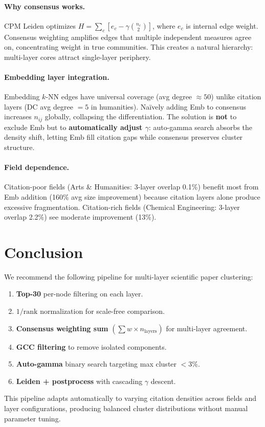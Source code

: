 \documentclass[11pt,a4paper]{article}
\begin{document}
\paragraph{Why consensus works.} CPM Leiden optimizes $H = \sum_c \left[e_c - \gamma \binom{n_c}{2}\right]$, where $e_c$ is internal edge weight. Consensus weighting amplifies edges that multiple independent measures agree on, concentrating weight in true communities. This creates a natural hierarchy: multi-layer cores attract single-layer periphery.

\paragraph{Embedding layer integration.} Embedding $k$-NN edges have universal coverage (avg degree $\approx 50$) unlike citation layers (DC avg degree $= 5$ in humanities). Na\"ively adding Emb to consensus increases $n_{ij}$ globally, collapsing the differentiation. The solution is \textbf{not} to exclude Emb but to \textbf{automatically adjust $\gamma$}: auto-gamma search absorbs the density shift, letting Emb fill citation gaps while consensus preserves cluster structure.

\paragraph{Field dependence.} Citation-poor fields (Arts \& Humanities: 3-layer overlap 0.1\%) benefit most from Emb addition (160\% avg size improvement) because citation layers alone produce excessive fragmentation. Citation-rich fields (Chemical Engineering: 3-layer overlap 2.2\%) see moderate improvement (13\%).

\section{Conclusion}

We recommend the following pipeline for multi-layer scientific paper clustering:

\begin{enumerate}[nosep]
    \item \textbf{Top-30} per-node filtering on each layer.
    \item \textbf{$1/\text{rank}$} normalization for scale-free comparison.
    \item \textbf{Consensus weighting sum} $(\sum w \times n_{\text{layers}})$ for multi-layer agreement.
    \item \textbf{GCC filtering} to remove isolated components.
    \item \textbf{Auto-gamma} binary search targeting max cluster $< 3\%$.
    \item \textbf{Leiden + postprocess} with cascading $\gamma$ descent.
\end{enumerate}

This pipeline adapts automatically to varying citation densities across fields and layer configurations, producing balanced cluster distributions without manual parameter tuning.
\end{document}
